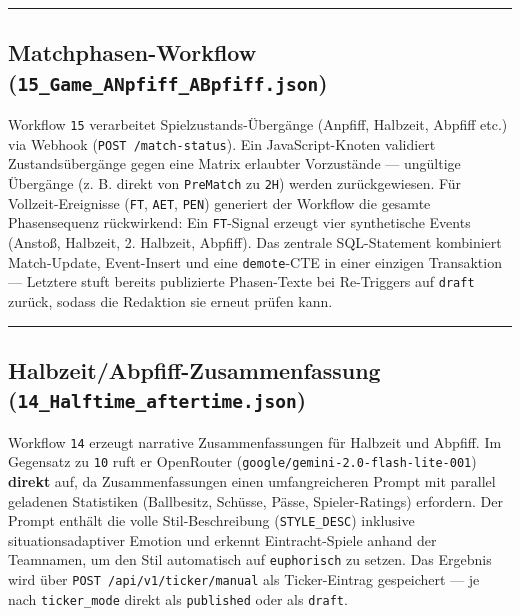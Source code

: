 \begin{center}\rule{0.5\linewidth}{0.5pt}\end{center}

\subsection{\texorpdfstring{Matchphasen-Workflow
(\texttt{15\_Game\_ANpfiff\_ABpfiff.json})}{Matchphasen-Workflow (15\_Game\_ANpfiff\_ABpfiff.json)}}\label{matchphasen-workflow-15_game_anpfiff_abpfiff.json}

Workflow \texttt{15} verarbeitet Spielzustands-Übergänge (Anpfiff,
Halbzeit, Abpfiff etc.) via Webhook (\texttt{POST\ /match-status}). Ein
JavaScript-Knoten validiert Zustandsübergänge gegen eine Matrix
erlaubter Vorzustände --- ungültige Übergänge (z. B. direkt von
\texttt{PreMatch} zu \texttt{2H}) werden zurückgewiesen. Für
Vollzeit-Ereignisse (\texttt{FT}, \texttt{AET}, \texttt{PEN}) generiert
der Workflow die gesamte Phasensequenz rückwirkend: Ein
\texttt{FT}-Signal erzeugt vier synthetische Events (Anstoß, Halbzeit,
2. Halbzeit, Abpfiff). Das zentrale SQL-Statement kombiniert
Match-Update, Event-Insert und eine \texttt{demote}-CTE in einer
einzigen Transaktion --- Letztere stuft bereits publizierte Phasen-Texte
bei Re-Triggers auf \texttt{draft} zurück, sodass die Redaktion sie
erneut prüfen kann.

\begin{center}\rule{0.5\linewidth}{0.5pt}\end{center}

\subsection{\texorpdfstring{Halbzeit/Abpfiff-Zusammenfassung
(\texttt{14\_Halftime\_aftertime.json})}{Halbzeit/Abpfiff-Zusammenfassung (14\_Halftime\_aftertime.json)}}\label{halbzeitabpfiff-zusammenfassung-14_halftime_aftertime.json}

Workflow \texttt{14} erzeugt narrative Zusammenfassungen für Halbzeit
und Abpfiff. Im Gegensatz zu \texttt{10} ruft er OpenRouter
(\texttt{google/gemini-2.0-flash-lite-001}) \textbf{direkt} auf, da
Zusammenfassungen einen umfangreicheren Prompt mit parallel geladenen
Statistiken (Ballbesitz, Schüsse, Pässe, Spieler-Ratings) erfordern. Der
Prompt enthält die volle Stil-Beschreibung (\texttt{STYLE\_DESC})
inklusive situationsadaptiver Emotion und erkennt Eintracht-Spiele
anhand der Teamnamen, um den Stil automatisch auf \texttt{euphorisch} zu
setzen. Das Ergebnis wird über \texttt{POST\ /api/v1/ticker/manual} als
Ticker-Eintrag gespeichert --- je nach \texttt{ticker\_mode} direkt als
\texttt{published} oder als \texttt{draft}.

